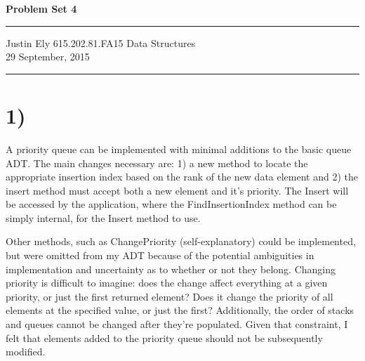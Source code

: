 \documentclass[a4paper,11pt]{article}
\begin{document}
\begin{flushright}

\vspace{1.1cm}

{\bf\Huge Problem Set 4}

\rule{0.25\linewidth}{0.5pt}

\vspace{0.5cm}
Justin Ely
\linebreak
\newline
\footnotesize{615.202.81.FA15 Data Structures \\}
\vspace{0.5cm}
29 September, 2015
\end{flushright}

\noindent\rule{\linewidth}{1.0pt}


\section*{1)}
A priority queue can be implemented with minimal additions to the basic queue ADT.  The main changes necessary are: 1) a new method to locate the appropriate insertion index based on the rank of the new data element and 2) the insert method must accept both a new element and it's priority.  The Insert will be accessed by the application, where the FindInsertionIndex method can be simply internal, for the Insert method to use.

Other methods, such as ChangePriority (self-explanatory) could be implemented, but were omitted from my ADT because of the potential ambiguities in implementation and uncertainty as to whether or not they belong.  Changing priority is difficult to imagine: does the change affect everything at a given priority, or just the first returned element?  Does it change the priority of all elements at the specified value, or just the first?  Additionally, the order of stacks and queues cannot be changed after they're populated.  Given that constraint, I felt that elements added to the priority queue should not be subsequently modified.
\end{document}

